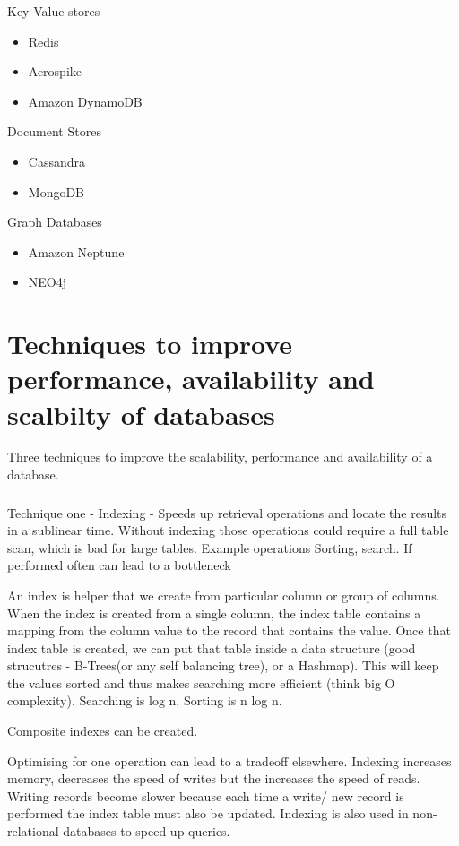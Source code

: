 \documentclass[a4paper, 11pt]{book}
\begin{document}
    Key-Value stores
    \begin{itemize}
        \item Redis
        \item Aerospike
        \item Amazon DynamoDB
    \end{itemize}
    Document Stores
    \begin{itemize}
        \item Cassandra
        \item MongoDB
    \end{itemize}
    Graph Databases
    \begin{itemize}
        \item Amazon Neptune
        \item NEO4j
    \end{itemize}

    \section{Techniques to improve performance, availability and scalbilty of databases}
    Three techniques to improve the scalability, performance and availability of a database.

    \subsubsection{}
    Technique one - Indexing - Speeds up retrieval operations and locate the results in a sublinear time.
    Without indexing those operations could require a full table scan, which is bad for large tables.
    Example operations
    Sorting, search.
    If performed often can lead to a bottleneck

    An index is helper that we create from particular column or group of columns.
    When the index is created from a single column, the index table contains a mapping from the column value to the record that contains the value.
    Once that index table is created, we can put that table inside a data structure (good strucutres - B-Trees(or any self balancing tree), or a Hashmap).
    This will keep the values sorted and thus makes searching more efficient (think big O complexity).
    Searching is log n.
    Sorting is n log n.

    Composite indexes can be created.


    Optimising for one operation can lead to a tradeoff elsewhere.
    Indexing increases memory, decreases the speed of writes but the increases the speed of reads.
    Writing records become slower because each time a write/ new record is performed the index table must also be updated.
    Indexing is also used in non-relational databases to speed up queries.
\end{document}
